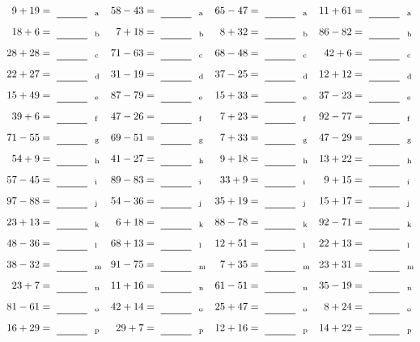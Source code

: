 \documentclass
[
  draft    = true,
  fontsize = 11pt,
  parskip  = half-
]
{scrartcl}
\begin{document}
\clearpage
\begin{align*}
    \pline{9+19}&=\rline{a}
  & \pline{58-43}&=\rline{a}
  & \pline{65-47}&=\rline{a}
  & \pline{11+61}&=\rline{a} \\[1ex]
    \pline{18+6}&=\rline{b}
  & \pline{7+18}&=\rline{b}
  & \pline{8+32}&=\rline{b}
  & \pline{86-82}&=\rline{b} \\[1ex]
    \pline{28+28}&=\rline{c}
  & \pline{71-63}&=\rline{c}
  & \pline{68-48}&=\rline{c}
  & \pline{42+6}&=\rline{c} \\[1ex]
    \pline{22+27}&=\rline{d}
  & \pline{31-19}&=\rline{d}
  & \pline{37-25}&=\rline{d}
  & \pline{12+12}&=\rline{d} \\[1ex]
    \pline{15+49}&=\rline{e}
  & \pline{87-79}&=\rline{e}
  & \pline{15+33}&=\rline{e}
  & \pline{37-23}&=\rline{e} \\[1ex]
    \pline{39+6}&=\rline{f}
  & \pline{47-26}&=\rline{f}
  & \pline{7+23}&=\rline{f}
  & \pline{92-77}&=\rline{f} \\[1ex]
    \pline{71-55}&=\rline{g}
  & \pline{69-51}&=\rline{g}
  & \pline{7+33}&=\rline{g}
  & \pline{47-29}&=\rline{g} \\[1ex]
    \pline{54+9}&=\rline{h}
  & \pline{41-27}&=\rline{h}
  & \pline{9+18}&=\rline{h}
  & \pline{13+22}&=\rline{h} \\[1ex]
    \pline{57-45}&=\rline{i}
  & \pline{89-83}&=\rline{i}
  & \pline{33+9}&=\rline{i}
  & \pline{9+15}&=\rline{i} \\[1ex]
    \pline{97-88}&=\rline{j}
  & \pline{54-36}&=\rline{j}
  & \pline{35+19}&=\rline{j}
  & \pline{15+17}&=\rline{j} \\[1ex]
    \pline{23+13}&=\rline{k}
  & \pline{6+18}&=\rline{k}
  & \pline{88-78}&=\rline{k}
  & \pline{92-71}&=\rline{k} \\[1ex]
    \pline{48-36}&=\rline{l}
  & \pline{68+13}&=\rline{l}
  & \pline{12+51}&=\rline{l}
  & \pline{22+13}&=\rline{l} \\[1ex]
    \pline{38-32}&=\rline{m}
  & \pline{91-75}&=\rline{m}
  & \pline{7+35}&=\rline{m}
  & \pline{23+31}&=\rline{m} \\[1ex]
    \pline{23+7}&=\rline{n}
  & \pline{11+16}&=\rline{n}
  & \pline{61-51}&=\rline{n}
  & \pline{35-19}&=\rline{n} \\[1ex]
    \pline{81-61}&=\rline{o}
  & \pline{42+14}&=\rline{o}
  & \pline{25+47}&=\rline{o}
  & \pline{8+24}&=\rline{o} \\[1ex]
    \pline{16+29}&=\rline{p}
  & \pline{29+7}&=\rline{p}
  & \pline{12+16}&=\rline{p}
  & \pline{14+22}&=\rline{p}
\end{align*}
\end{document}

